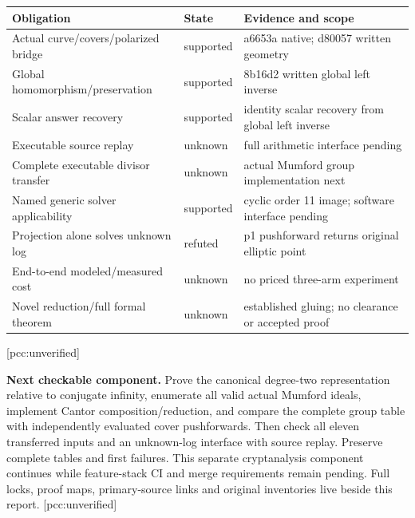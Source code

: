 \documentclass[10pt,a4paper]{article}
\begin{document}
\begin{center}\small
\begin{tabular}{p{57mm}p{24mm}p{71mm}}
\toprule
Obligation & State & Evidence and scope\\
\midrule
Actual curve/covers/polarized bridge & supported & a6653a native; d80057 written geometry\\
Global homomorphism/preservation & supported & 8b16d2 written global left inverse\\
Scalar answer recovery & supported & identity scalar recovery from global left inverse\\
Executable source replay & unknown & full arithmetic interface pending\\
Complete executable divisor transfer & unknown & actual Mumford group implementation next\\
Named generic solver applicability & supported & cyclic order 11 image; software interface pending\\
Projection alone solves unknown log & refuted & p1 pushforward returns original elliptic point\\
End-to-end modeled/measured cost & unknown & no priced three-arm experiment\\
Novel reduction/full formal theorem & unknown & established gluing; no clearance or accepted proof\\
\bottomrule
\end{tabular}\end{center}
[pcc:unverified]

\textbf{Next checkable component.} Prove the canonical degree-two
representation relative to conjugate infinity, enumerate all valid actual
Mumford ideals, implement Cantor composition/reduction, and compare the
complete group table with independently evaluated cover pushforwards.
Then check all eleven transferred inputs and an unknown-log interface
with source replay. Preserve complete tables and first failures. This
separate cryptanalysis component continues while feature-stack CI and
merge requirements remain pending. Full locks, proof maps, primary-source
links and original inventories live beside this report. [pcc:unverified]
\end{document}
